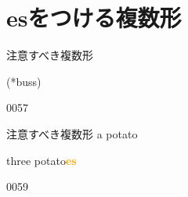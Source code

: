 \documentclass[aspectratio=169,xcolor={dvipsnames,table}]{beamer}
\newcommand{\myaudio}[1]{\href{#1}{\faVolumeUp}}
\begin{document}
\section{esをつける複数形}
\begin{frame}[plain]{注意すべき複数形}

\hspace{15pt}
\pause

\bigskip

\bigskip

\hspace{15pt}
\hfill{}(*buss)

{\tiny 0057}\,{\scriptsize \myaudio{./audio/005_singular_plural_05.mp3}}
\end{frame}
\begin{frame}[plain]{注意すべき複数形}
\hspace{15pt}
\pause
{\LARGE a potato} 
\pause

\bigskip

\bigskip

\hspace{15pt}
\pause
{\LARGE three  potato\textcolor{orange}{\bfseries es}}

{\tiny 0059}\,{\scriptsize \myaudio{./audio/005_singular_plural_06.mp3}}
\end{frame}
\end{document}
